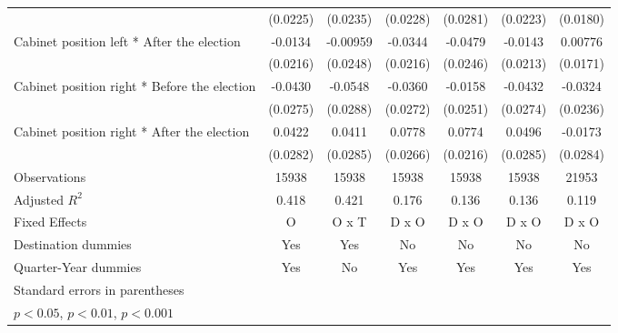 \begin{table}[htbp]
\begin{tabular}{l*{6}{c}}
                    &    (0.0225)         &    (0.0235)         &    (0.0228)         &    (0.0281)         &    (0.0223)         &    (0.0180)         \\
[1em]
Cabinet position left * After the election&     -0.0134         &    -0.00959         &     -0.0344         &     -0.0479         &     -0.0143         &     0.00776         \\
                    &    (0.0216)         &    (0.0248)         &    (0.0216)         &    (0.0246)         &    (0.0213)         &    (0.0171)         \\
[1em]
Cabinet position right * Before the election&     -0.0430         &     -0.0548         &     -0.0360         &     -0.0158         &     -0.0432         &     -0.0324         \\
                    &    (0.0275)         &    (0.0288)         &    (0.0272)         &    (0.0251)         &    (0.0274)         &    (0.0236)         \\
[1em]
Cabinet position right * After the election&      0.0422         &      0.0411         &      0.0778\sym{**} &      0.0774\sym{***}&      0.0496         &     -0.0173         \\
                    &    (0.0282)         &    (0.0285)         &    (0.0266)         &    (0.0216)         &    (0.0285)         &    (0.0284)         \\
\hline
Observations        &       15938         &       15938         &       15938         &       15938         &       15938         &       21953         \\
Adjusted \(R^{2}\)  &       0.418         &       0.421         &       0.176         &       0.136         &       0.136         &       0.119         \\
Fixed Effects       &           O         &       O x T         &       D x O         &       D x O         &       D x O         &       D x O         \\
Destination dummies &         Yes         &         Yes         &          No         &          No         &          No         &          No         \\
Quarter-Year dummies&         Yes         &          No         &         Yes         &         Yes         &         Yes         &         Yes         \\
\hline\hline
\multicolumn{7}{l}{\footnotesize Standard errors in parentheses}\\
\multicolumn{7}{l}{\footnotesize \sym{*} \(p<0.05\), \sym{**} \(p<0.01\), \sym{***} \(p<0.001\)}\\
\end{tabular}
\end{table}
